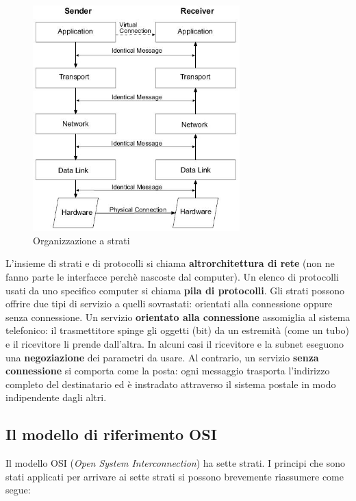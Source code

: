 \begin{figure}[htbp]
\centering
\includegraphics[width=80mm]{images/layers.jpg}
\caption{Organizzazione a strati}
\end{figure}

L'insieme di strati e di protocolli si chiama \textbf{altrorchitettura di rete} (non ne fanno parte le interfacce perchè nascoste dal computer). Un elenco di protocolli usati da uno specifico computer si chiama \textbf{pila di protocolli}.
\linebreak
\linebreak
Gli strati possono offrire due tipi di servizio a quelli sovrastati: orientati alla connessione oppure senza connessione. Un servizio \textbf{orientato alla connessione} assomiglia al sistema telefonico: il trasmettitore spinge gli oggetti (bit) da un estremità (come un tubo) e il ricevitore li prende dall'altra. In alcuni casi il ricevitore e la subnet eseguono una \textbf{negoziazione} dei parametri da usare. 
Al contrario, un servizio \textbf{senza connessione} si comporta come la posta: ogni messaggio trasporta l'indirizzo completo del destinatario ed è instradato attraverso il sistema postale in modo indipendente dagli altri.

\subsection{Il modello di riferimento OSI}

Il modello OSI (\textit{Open System Interconnection}) ha sette strati. I principi che sono stati applicati per arrivare ai sette strati si possono brevemente riassumere come segue:

